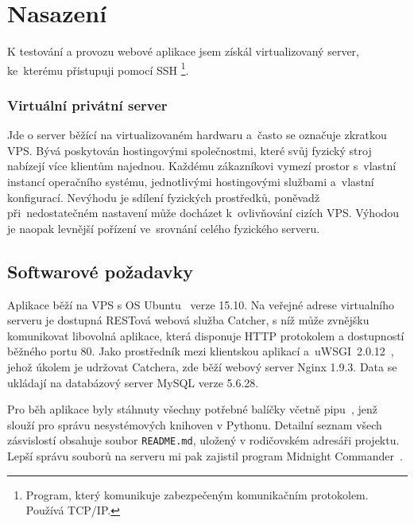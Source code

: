 \chapter{Nasazení}

K testování a provozu webové aplikace jsem získál virtualizovaný server, ke~kterému přistupuji pomocí SSH
\footnote{Program, který komunikuje zabezpečeným komunikačním protokolem. Používá TCP/IP.}.

\subsection*{Virtuální privátní server}

Jde o server běžící na virtualizovaném hardwaru a~často se označuje zkratkou VPS.
Bývá poskytován hostingovými společnostmi, které svůj fyzický stroj nabízejí více klientům najednou.
Každému zákazníkovi vymezí prostor s~vlastní instancí operačního systému, jednotlivými hostingovými službami
a~vlastní konfigurací. Nevýhodu je sdílení fyzických prostředků, poněvadž při~nedostatečném nastavení
může docházet k~ovlivňování cizích VPS. Výhodou je naopak levnější pořízení ve~srovnání celého fyzického serveru.

\section{Softwarové požadavky}

Aplikace běží na VPS s OS Ubuntu~\cite{ubuntu} verze 15.10. Na veřejné adrese virtualního serveru
je dostupná RESTová webová služba Catcher, s níž může zvnějšku komunikovat libovolná aplikace,
která disponuje HTTP protokolem a dostupností běžného portu 80. Jako prostředník mezi klientskou aplikací
a~uWSGI~2.0.12~\cite{python_uwsgi}, jehož úkolem je udržovat Catchera, zde běží webový server Nginx 1.9.3.
Data se ukládají na databázový server MySQL verze 5.6.28.

Pro běh aplikace byly stáhnuty všechny potřebné balíčky včetně pipu~\cite{python_pip},
jenž slouží pro správu nesystémových knihoven v Pythonu. Detailní seznam všech zásvislostí obsahuje soubor
\texttt{README.md}, uložený v rodičovském adresáři projektu. Lepší správu souborů na serveru mi pak zajistil program Midnight Commander~\cite{mc}.

